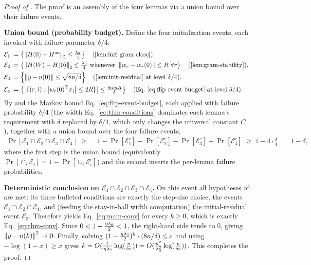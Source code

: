 \begin{proof}[Proof of ]
The proof is an assembly of the four lemmas via a union bound over their failure events.

\smallskip\noindent\textbf{Union bound (probability budget).}
Define the four initialization events, each invoked with failure parameter $\delta/4$:
\begin{align}\label{eq:events}
\mathcal{E}_1 &:= \left\{ \opnorm{H(0) - \Hinf} \le \tfrac{\lzero}{4} \right\}
\quad (\text{\Cref{lem:init-gram-close}}), \notag \\
\mathcal{E}_2 &:= \left\{ \opnorm{H(W) - H(0)} \le \tfrac{\lzero}{4}
\text{ whenever } \norm{w_r - w_r(0)} \le R \ \forall r \right\}
\quad (\text{\Cref{lem:gram-stability}}), \\
\mathcal{E}_3 &:= \left\{ \norm{y - u(0)} \le \sqrt{8n/\delta} \right\}
\quad (\text{\Cref{lem:init-residual} at level } \delta/4), \notag \\
\mathcal{E}_4 &:= \left\{ \abs{\{(r,i) : \abs{w_r(0)^\top x_i} \le 2R\}}
\le \tfrac{8 n m R}{\delta} \right\}
\quad (\text{Eq.~\eqref{eq:flip-event-budget} at level } \delta/4). \notag
\end{align}
By  and the Markov bound
Eq.~\eqref{eq:flip-event-budget}, each applied with failure probability $\delta/4$ (the width
Eq.~\eqref{eq:thm-conditions} dominates each lemma's requirement with $\delta$ replaced by
$\delta/4$, which only changes the universal constant $C$), together with a union bound over
the four failure events,
\begin{align}\label{eq:union}
\Pr\!\left[ \mathcal{E}_1 \cap \mathcal{E}_2 \cap \mathcal{E}_3 \cap \mathcal{E}_4 \right]
\;\ge\; & ~ 1 - \Pr[\mathcal{E}_1^c] - \Pr[\mathcal{E}_2^c] - \Pr[\mathcal{E}_3^c]
- \Pr[\mathcal{E}_4^c]
\;\ge\; 1 - 4 \cdot \frac{\delta}{4}
\;=\; 1 - \delta,
\end{align}
where the first step is the union bound (equivalently $\Pr[\cap_i \mathcal{E}_i]
= 1 - \Pr[\cup_i \mathcal{E}_i^c]$) and the second inserts the per-lemma failure probabilities.

\smallskip\noindent\textbf{Deterministic conclusion on $\mathcal{E}_1 \cap \mathcal{E}_2 \cap \mathcal{E}_3 \cap \mathcal{E}_4$.}
On this event all hypotheses of  are met: its three bulleted conditions are
exactly the step-size choice, the events $\mathcal{E}_1 \cap \mathcal{E}_2 \cap \mathcal{E}_4$,
and (feeding the stay-in-ball width computation) the initial-residual event $\mathcal{E}_3$.
Therefore
 yields Eq.~\eqref{eq:main-conv} for every $k \ge 0$, which is exactly
Eq.~\eqref{eq:thm-conv}. Since $0 < 1 - \tfrac{\eta\lambda_{0}}{2} < 1$, the right-hand side tends to
$0$, giving $\left\| y - u(k) \right\|^2 \to 0$. Finally, solving
$(1 - \tfrac{\eta\lambda_{0}}{2})^k \cdot (8n/\delta) \le \varepsilon$ and using $-\log(1 - x) \ge x$
gives $k = O(\tfrac{1}{\eta\lambda_{0}}\log(\tfrac{n}{\delta\varepsilon}))
= O(\tfrac{n^2}{\lambda_{0}^2}\log(\tfrac{n}{\delta\varepsilon}))$. This completes the proof.
\end{proof}
